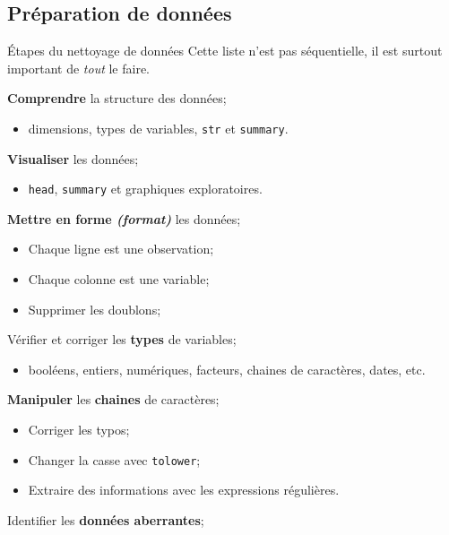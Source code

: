 \documentclass[10pt, french]{article}
\begin{document}
\begin{multicols*}{3} 

\section{Préparation de données}

\begin{algo}{Étapes du nettoyage de données}
Cette liste n'est pas séquentielle, il est surtout important de \textit{tout} le faire.
\begin{todolist}[leftmargin = *]
	\item	\textbf{Comprendre} la structure des données;
		\begin{itemize}
		\item	dimensions, types de variables, \texttt{str} et \texttt{summary}.
		\end{itemize}
	\item	\textbf{Visualiser} les données;
		\begin{itemize}
		\item	\texttt{head}, \texttt{summary} et graphiques exploratoires.
		\end{itemize}
	\item	\textbf{Mettre en forme \textit{(format)}} les données;
		\begin{itemize}
		\item	Chaque ligne est une observation;
		\item	Chaque colonne est une variable;
		\item	Supprimer les doublons;
		\end{itemize}
	\item	Vérifier et corriger les \textbf{types} de variables;
		\begin{itemize}
		\item	booléens, entiers, numériques, facteurs, chaines de caractères, dates, etc.
		\end{itemize}
	\item	\textbf{Manipuler} les \textbf{chaines} de caractères;
		\begin{itemize}
		\item	Corriger les typos;
		\item	Changer la casse avec \texttt{tolower};
		\item	Extraire des informations avec les expressions régulières.
		\end{itemize}
	\item	Identifier les \textbf{données aberrantes};
		\begin{itemize}

\end{itemize}
\end{todolist}
\end{algo}
\end{multicols*}
\end{document}
